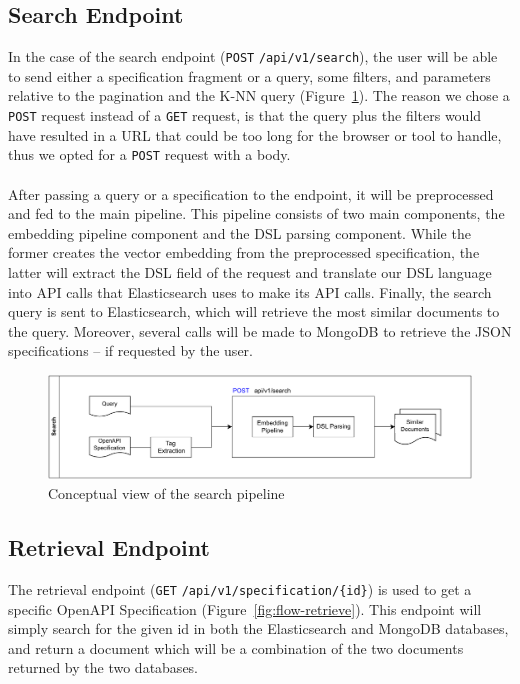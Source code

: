 \subsection{Search Endpoint}\label{subsec:search-endpoint-1}
In the case of the search endpoint (\verb|POST| \verb|/api/v1/search|), the user will be able to send either a specification fragment or a query, some filters, and parameters relative to the pagination and the K-NN query (Figure~\ref{fig:flow-search}).
The reason we chose a \verb|POST| request instead of a \verb|GET| request, is that the query plus the filters would have resulted in a URL that could be too long for the browser or tool to handle, thus we opted for a \verb|POST| request with a body. \\ \\
After passing a query or a specification to the endpoint, it will be preprocessed and fed to the main pipeline.
This pipeline consists of two main components, the embedding pipeline component and the DSL parsing component.
While the former creates the vector embedding from the preprocessed specification, the latter will extract the DSL field of the request and translate our DSL language into API calls that Elasticsearch uses to make its API calls.
Finally, the search query is sent to Elasticsearch, which will retrieve the most similar documents to the query.
Moreover, several calls will be made to MongoDB to retrieve the JSON specifications -- if requested by the user.

\begin{figure}[!h]
    \begin{center}
        \includegraphics[width=0.9\linewidth]{assets/pdf/architecture/flow-search}
    \end{center}

    \caption{Conceptual view of the search pipeline}
    \label{fig:flow-search}
\end{figure}

\subsection{Retrieval Endpoint}\label{subsec:retrieval-endpoint-1}
The retrieval endpoint (\verb|GET| \verb|/api/v1/specification/{id}|) is used to get a specific OpenAPI Specification (Figure~\ref{fig:flow-retrieve}).
This endpoint will simply search for the given id in both the Elasticsearch and MongoDB databases, and return a document which will be a combination of the two documents returned by the two databases.

